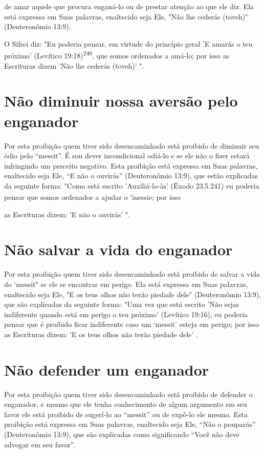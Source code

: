 de amar aquele que procura enganá-lo ou de prestar atenção ao que ele
diz. Ela está expressa em Suas palavras, enaltecido seja Ele, "Não lhe
cederás (to­veh)" (Deuteronômio 13:9).

O Sifrei diz: "Eu poderia pensar, em virtude do princípio geral 'E
amarás o teu próximo' (Levítico 19:18)\textsuperscript{240}, que somos
ordenados a amá-lo; por isso as Escrituras dizem 'Não lhe cederás
(toveh)' ".

\section{Não diminuir nossa aversão pelo enganador}

Por esta proibição quem tiver sido desencaminhado está proibido de
diminuir seu ódio pelo ``messit''. É sou dever incondicional odiá-lo e se
ele não o fizer estará infringindo um preceito negativo. Esta proibição
está expres­sa em Suas palavras, enaltecido seja Ele, ``E não o ouvirás''
(Deuteronômio 13:9), que estão explicadas da seguinte forma: "Como está
escrito 'Auxiliá-lo-às' (Êxodo 23\textsubscript{:}5.241) 
eu poderia pensar que somos ordenados a ajudar o 'inessie; por isso

as Escrituras dizem: 'E não o ouvirás' ".

\section{Não salvar a vida do enganador}

Por esta proibição quem tiver sido desencaminhado está proibido de
salvar a vida do `messit" se ele se encontrar em perigo. Ela está
expressa em Suas palavras, enaltecido seja Ele, "E os teus olhos não
terão piedade dele" (Deuteronômio 13:9), que são explicadas da seguinte
forma: "Uma vez que es­tá escrito 'Não sejas indiferente quando está em
perigo o teu próximo' (Levíti­co 19:16), eu poderia pensar que é
proibido ficar indiferente caso um `messit' esteja em perigo; por isso
as Escrituras dizem: 'E os teus olhos não terão pieda­de dele' .

\section{Não defender um enganador}

Por esta proibição quem tiver sido desencaminhado está proibido de
defender o enganador, e mesmo que ele tenha conhecimento de algum
ar­gumento em seu favor ele está proibido de sugerí-lo ao ``messit'' ou de
expô-lo ele mesmo. Esta proibição está expressa em Suas palavras,
enaltecido seja Ele, ``Não o pouparás'' (Deuteronômio 13:9), que são
explicadas como significan­do ``Você não deve advogar em seu favor''.

